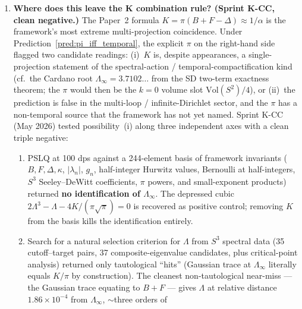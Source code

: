 \documentclass[11pt]{article}
\begin{document}
\begin{enumerate}
For the temperature-corrected case on $S^3 \times S^1_\beta$, fermions
require antiperiodic (Neveu-Schwarz-like) boundary conditions on the
temporal circle; the Matsubara modes shift to
$\omega^t_k = (2k+1)\pi/\beta$ instead of $2\pi k/\beta$.  $\pi$
enters at the lowest mode $\omega^t_0 = \pi/\beta$ (no zero mode).
The injection mechanism is structurally identical to KG-2 --- the
$\pi$ is the radian/circumference ratio of the temporal $S^1$ ---
shifted by half a Matsubara unit because of the spin structure.

\item \textbf{Where does this leave the K combination rule? (Sprint K-CC,
clean negative.)}  The Paper~2 formula
$K = \pi(B + F - \Delta) \approx 1/\alpha$ is the framework's most
extreme multi-projection coincidence.  Under
Prediction~\ref{pred:pi_iff_temporal}, the explicit $\pi$ on the
right-hand side flagged two candidate readings: (i)~$K$ is, despite
appearances, a single-projection statement of the spectral-action /
temporal-compactification kind (cf.~the Cardano root $\Lambda_\infty
= 3.7102\ldots$ from the SD two-term exactness theorem; the $\pi$
would then be the $k = 0$ volume slot $\mathrm{Vol}(S^2)/4$), or (ii)~the prediction is false in the multi-loop /
infinite-Dirichlet sector, and the $\pi$ has a non-temporal source
that the framework has not yet named.  Sprint K-CC (May 2026) tested
possibility~(i) along three independent axes with a clean triple
negative:
\begin{enumerate}\setlength\itemsep{0pt}
\item PSLQ at 100 dps against a 244-element basis of framework
invariants ($B, F, \Delta, \kappa$, $|\lambda_n|$, $g_n$, half-integer
Hurwitz values, Bernoulli at half-integers, $S^3$ Seeley--DeWitt
coefficients, $\pi$ powers, and small-exponent products) returned
\textbf{no identification of $\Lambda_\infty$}.  The depressed cubic
$2\Lambda^3 - \Lambda - 4K/(\pi\sqrt{\pi}) = 0$ is recovered as
positive control; removing $K$ from the basis kills the
identification entirely.
\item Search for a natural selection criterion for $\Lambda$ from
$S^3$ spectral data (35 cutoff--target pairs, 37 composite-eigenvalue
candidates, plus critical-point analysis) returned only tautological
``hits'' (Gaussian trace at $\Lambda_\infty$ literally equals $K/\pi$
by construction).  The cleanest non-tautological near-miss --- the
Gaussian trace equating to $B + F$ --- gives $\Lambda$ at relative
distance $1.86\times 10^{-4}$ from $\Lambda_\infty$, $\sim$three orders of

\end{enumerate}
\end{enumerate}
\end{document}
